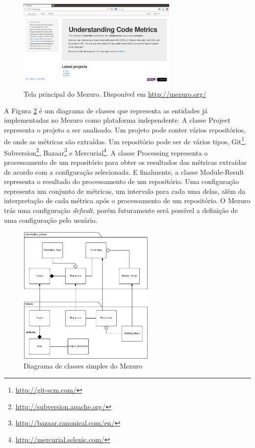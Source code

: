 \graphicspath{{figuras/}}
\begin{figure}[H]
\centering
\includegraphics[width=0.7\textwidth]{mezuro-standalone}
\caption{Tela principal do Mezuro. Disponível em \url{http://mezuro.org/}}
\label{mezuro}
\end{figure}


A Figura \ref{class-diagram} é um diagrama de classes que representa as entidades já implementadas no Mezuro como plataforma independente. A classe Project representa o projeto a ser analisado. Um projeto pode conter vários repositórios, de onde as métricas são extraídas.  Um repositório pode ser de vários tipos, Git\footnote{\url{http://git-scm.com/}}, Subversion\footnote{\url{http://subversion.apache.org/}}, Bazaar\footnote{\url{http://bazaar.canonical.com/en/}} e Mercurial\footnote{\url{http://mercurial.selenic.com/}}. A classe Processing representa o processamento de um repositório para obter os resultados das métricas extraídas de acordo com a configuração selecionada. E finalmente, a classe Module-Result representa o resultado do processamento de um repositório. Uma configuração representa um conjunto de métricas, um intervalo para cada uma delas, além da interpretação de cada métrica após o processamento de um repositório. O Mezuro trás uma configuração \textit{default}, porém futuramente será possível a definição de uma configuração pelo usuário.

\graphicspath{{figuras/}}
\begin{figure}[H]
\centering
\includegraphics[width=0.6\textwidth]{class-diagram-mezuro}
\caption{Diagrama de classes simples do Mezuro}
\label{class-diagram}
\end{figure}








